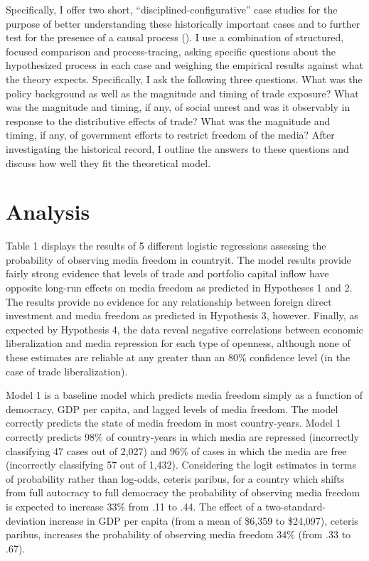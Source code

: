 \documentclass[12pt]{report}
\begin{document}
Specifically, I offer two short, ``disciplined-configurative'' case studies for the purpose of
better understanding these historically important cases and to further test for the presence of a
causal process (\citealt[75]{george2005case}). I use a combination of structured, focused comparison
and process-tracing, asking specific questions about the hypothesized process in each case and
weighing the empirical results against what the theory expects. Specifically, I ask the following
three questions. What was the policy background as well as the magnitude and timing of trade
exposure? What was the magnitude and timing, if any, of social unrest and was it observably in
response to the distributive effects of trade? What was the magnitude and timing, if any, of
government efforts to restrict freedom of the media? After investigating the historical record, I
outline the answers to these questions and discuss how well they fit the theoretical model.

\section{Analysis}

Table 1 displays the results of 5 different logistic regressions assessing the probability of
observing media freedom in countryit. The model results provide fairly strong evidence that levels
of trade and portfolio capital inflow have opposite long-run effects on media freedom as predicted
in Hypotheses 1 and 2. The results provide no evidence for any relationship between foreign direct
investment and media freedom as predicted in Hypothesis 3, however. Finally, as expected by
Hypothesis 4, the data reveal negative correlations between economic liberalization and media
repression for each type of openness, although none of these estimates are reliable at any greater
than an 80\% confidence level (in the case of trade liberalization).

Model 1 is a baseline model which predicts media freedom simply as a function of democracy, GDP per
capita, and lagged levels of media freedom. The model correctly predicts the state of media freedom
in most country-years. Model 1 correctly predicts 98\% of country-years in which media are repressed
(incorrectly classifying 47 cases out of 2,027) and 96\% of cases in which the media are free
(incorrectly classifying 57 out of 1,432). Considering the logit estimates in terms of probability
rather than log-odds, ceteris paribus, for a country which shifts from full autocracy to full
democracy the probability of observing media freedom is expected to increase 33\% from .11 to .44.
The effect of a two-standard-deviation increase in GDP per capita (from a mean of \$6,359 to
\$24,097), ceteris paribus, increases the probability of observing media freedom 34\% (from .33 to
.67).
\end{document}
